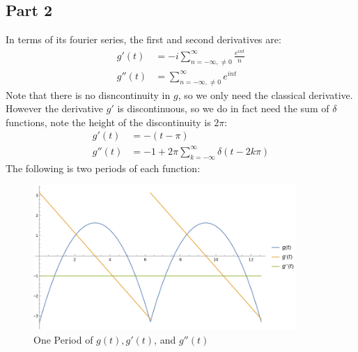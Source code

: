 \documentclass[12pt]{article}
\begin{document}
\subsection*{Part 2}
In terms of its fourier series, the first and second derivatives are:
\begin{equation}
  \boxed{
    \begin{aligned}
      g'(t)&=-i\sum_{n=-\infty,\neq0}^\infty\frac{e^{int}}{n}\\
      g''(t)&=\sum_{n=-\infty,\neq0}^\infty e^{int}
    \end{aligned}
  }
\end{equation}
Note that there is no disncontinuity in $g$, so we only need the classical derivative. However the derivative $g'$ is discontinuous, so we do in fact need the sum of $\delta$ functions, note the height of the discontinuity is $2\pi$:
\begin{equation}
  \boxed{
    \begin{aligned}
      g'(t)&=-(t-\pi)\\
      g''(t)&=-1+2\pi\sum_{k=-\infty}^\infty\delta(t-2k\pi)
    \end{aligned}
  }
\end{equation}
The following is two periods of each function:
\begin{figure}[H]
  \centering
  \includegraphics[width=10cm]{fourierplot.png}
  \caption{One Period of $g(t), g'(t)$, and $g''(t)$}
  \label{fig:1}
\end{figure}
\end{document}
